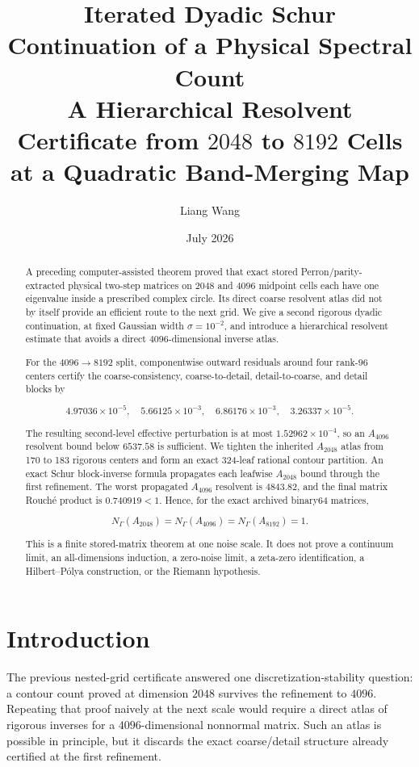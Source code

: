 \documentclass[11pt]{article}
\title{Iterated Dyadic Schur Continuation of a Physical Spectral Count\\
\large A Hierarchical Resolvent Certificate from $2048$ to $8192$ Cells\\
at a Quadratic Band-Merging Map}
\author{Liang Wang}
\date{July 2026}
\theoremstyle{definition}
\theoremstyle{remark}
\begin{document}
\maketitle

\begin{abstract}
A preceding computer-assisted theorem proved that exact stored
Perron/parity-extracted physical two-step matrices on $2048$ and $4096$
midpoint cells each have one eigenvalue inside a prescribed complex circle.
Its direct coarse resolvent atlas did not by itself provide an efficient route
to the next grid.  We give a second rigorous dyadic continuation, at fixed
Gaussian width \(\sigma=10^{-2}\), and introduce a hierarchical resolvent
estimate that avoids a direct $4096$-dimensional inverse atlas.

For the $4096\to8192$ split, componentwise outward residuals around four
rank-$96$ centers certify the coarse-consistency, coarse-to-detail,
detail-to-coarse, and detail blocks by

\[
4.97036\times10^{-5},\quad 5.66125\times10^{-3},\quad
6.86176\times10^{-3},\quad 3.26337\times10^{-5}.
\]

The resulting second-level effective perturbation is at most
$1.52962\times10^{-4}$, so an $A_{4096}$ resolvent bound below
$6537.58$ is sufficient.  We tighten the inherited $A_{2048}$ atlas from
170 to 183 rigorous centers and form an exact 324-leaf rational contour
partition.  An exact Schur block-inverse formula propagates each leafwise
$A_{2048}$ bound through the first refinement.  The worst propagated
$A_{4096}$ resolvent is $4843.82$, and the final matrix Rouch\'e product is
$0.740919<1$.  Hence, for the exact archived binary64 matrices,

\[
 \boxed{N_{\Gamma}(A_{2048})=N_{\Gamma}(A_{4096})
 =N_{\Gamma}(A_{8192})=1.}
\]

This is a finite stored-matrix theorem at one noise scale.  It does not prove
a continuum limit, an all-dimensions induction, a zero-noise limit, a zeta-zero
identification, a Hilbert--P\'olya construction, or the Riemann hypothesis.
\end{abstract}

\section{Introduction}

The previous nested-grid certificate \citep{WangNested2026} answered one
discretization-stability question: a contour count proved at dimension $2048$
survives the refinement to $4096$.  Repeating that proof naively at the next
scale would require a direct atlas of rigorous inverses for a
$4096$-dimensional nonnormal matrix.  Such an atlas is possible in principle,
but it discards the exact coarse/detail structure already certified at the
first refinement.
\end{document}
